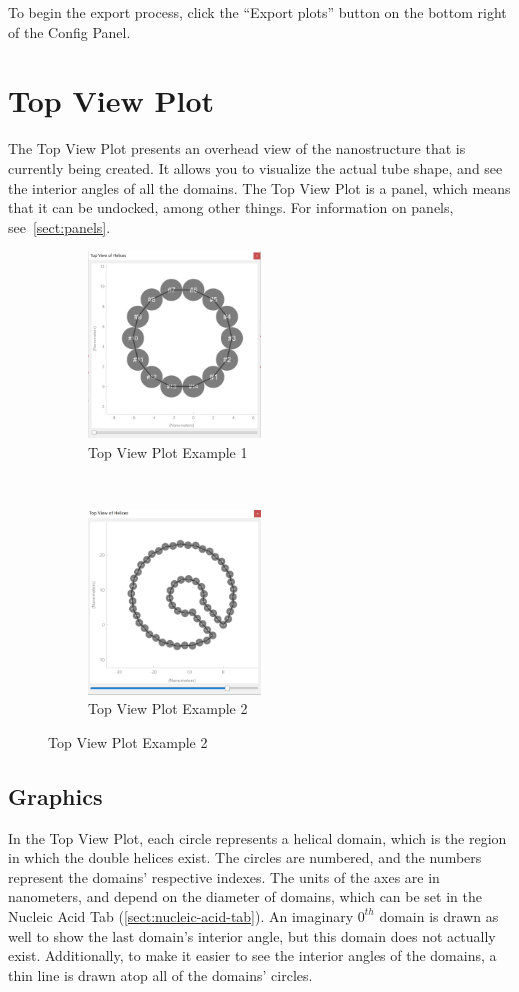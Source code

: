 \documentclass[titlepage]{article}
\begin{document}
To begin the export process, click the ``Export plots'' button on the bottom right of the Config Panel. 

\section{Top View Plot}

The Top View Plot presents an overhead view of the nanostructure that is currently being created. It allows you to visualize the actual tube shape, and see the interior angles of all the domains. The Top View Plot is a panel, which means that it can be undocked, among other things. For information on panels, see~\ref{sect:panels}.

\begin{figure}[h]
	\centering
	\label{fig:top-view-plot-panel}
	\caption{Top View Plot Panel}
	\begin{subfigure}{.45\linewidth}
		\centering
		\label{fig:top-view-plot-panel-1}
		\includegraphics[width=1.8in]{top-view-plot.png}
		\caption{Top View Plot Example 1}
	\end{subfigure}%
	~
	\begin{subfigure}{.45\linewidth}
		\centering
		\label{fig:top-view-plot-panel-2}
		\includegraphics[width=1.8in]{top-view-plot-2.png}
		\caption{Top View Plot Example 2}
	\end{subfigure}
\end{figure}

\subsection{Graphics}
In the Top View Plot, each circle represents a helical domain, which is the region in which the double helices exist. The circles are numbered, and the numbers represent the domains' respective indexes. The units of the axes are in nanometers, and depend on the diameter of domains, which can be set in the Nucleic Acid Tab (\ref{sect:nucleic-acid-tab}). An imaginary $0^{th}$ domain is drawn as well to show the last domain's interior angle, but this domain does not actually exist. Additionally, to make it easier to see the interior angles of the domains, a thin line is drawn atop all of the domains' circles.
\end{document}
